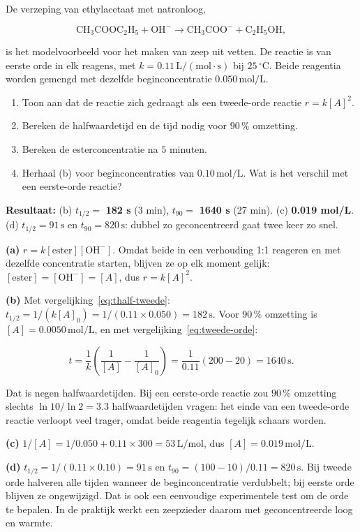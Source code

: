 \begin{oefening}
De verzeping van ethylacetaat met natronloog,

\[
\mathrm{CH_3COOC_2H_5 + OH^- \rightarrow CH_3COO^- + C_2H_5OH},
\]

is het modelvoorbeeld voor het maken van zeep uit vetten. De reactie is van eerste orde in elk reagens, met \(k = 0.11\,\mathrm{L/(mol\cdot s)}\) bij \(25\,^\circ\mathrm{C}\). Beide reagentia worden gemengd met dezelfde beginconcentratie \(0.050\,\mathrm{mol/L}\).

\begin{enumerate}
\item[(a)]
  Toon aan dat de reactie zich gedraagt als een tweede-orde reactie \(r = k[A]^2\).
\item[(b)]
  Bereken de halfwaardetijd en de tijd nodig voor \(90\,\%\) omzetting.
\item[(c)]
  Bereken de esterconcentratie na \(5\) minuten.
\item[(d)]
  Herhaal (b) voor beginconcentraties van \(0.10\,\mathrm{mol/L}\). Wat is het verschil met een eerste-orde reactie?
\end{enumerate}
\end{oefening}
\begin{oplossing}
\textbf{Resultaat:} (b) \(t_{1/2} =\) \textbf{182 s} (3 min), \(t_{90} =\) \textbf{1640 s} (27 min). (c) \textbf{0.019 mol/L}. (d) \(t_{1/2} = 91\,\mathrm{s}\) en \(t_{90} = 820\,\mathrm{s}\): dubbel zo geconcentreerd gaat twee keer zo snel.

\textbf{(a)} \(r = k[\text{ester}][\mathrm{OH^-}]\). Omdat beide in een verhouding 1:1 reageren en met dezelfde concentratie starten, blijven ze op elk moment gelijk: \([\text{ester}] = [\mathrm{OH^-}] = [A]\), dus \(r = k[A]^2\).

\textbf{(b)} Met vergelijking~\eqref{eq:thalf-tweede}: \(t_{1/2} = 1/(k[A]_0) = 1/(0.11 \times 0.050) = 182\,\mathrm{s}\). Voor \(90\,\%\) omzetting is \([A] = 0.0050\,\mathrm{mol/L}\), en met vergelijking~\eqref{eq:tweede-orde}:

\[
t = \frac{1}{k}\left(\frac{1}{[A]} - \frac{1}{[A]_0}\right) = \frac{1}{0.11}\left(200 - 20\right) = 1640\,\mathrm{s}.
\]

Dat is negen halfwaardetijden. Bij een eerste-orde reactie zou \(90\,\%\) omzetting slechts \(\ln 10/\ln 2 = 3.3\) halfwaardetijden vragen: het einde van een tweede-orde reactie verloopt veel trager, omdat beide reagentia tegelijk schaars worden.

\textbf{(c)} \(1/[A] = 1/0.050 + 0.11 \times 300 = 53\,\mathrm{L/mol}\), dus \([A] = 0.019\,\mathrm{mol/L}\).

\textbf{(d)} \(t_{1/2} = 1/(0.11 \times 0.10) = 91\,\mathrm{s}\) en \(t_{90} = (100 - 10)/0.11 = 820\,\mathrm{s}\). Bij tweede orde halveren alle tijden wanneer de beginconcentratie verdubbelt; bij eerste orde blijven ze ongewijzigd. Dat is ook een eenvoudige experimentele test om de orde te bepalen. In de praktijk werkt een zeepzieder daarom met geconcentreerde loog en warmte.
\end{oplossing}

